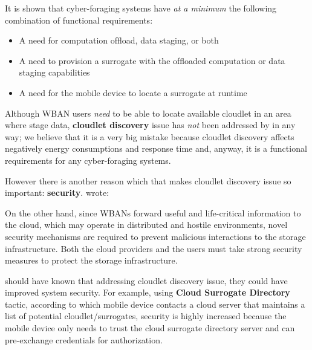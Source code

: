 \documentclass[sigchi]{acmart}
\begin{document}
It is shown \cite{DecisionModel} that cyber-foraging systems have \textit{at a minimum} the following combination of functional requirements:

\begin{itemize}

\item  A need for computation ofﬂoad, data staging, or both
\item  A need to provision a surrogate with the ofﬂoaded computation or data staging capabilities
\item  A need for the mobile device to locate a surrogate at runtime

\end{itemize}

Although WBAN users \textit{need} to be able to locate available cloudlet in an area where stage data, \textbf{cloudlet discovery} issue has \textit{not} been addressed by \citet{MSAReport} in any way; we believe that it is a very big mistake because cloudlet discovery affects negatively energy consumptions and response time and, anyway, it is a functional requirements for any cyber-foraging systems. 

However there is another reason which that makes cloudlet discovery issue so important: \textbf{security}. \citep{MSAReport} wrote:

\vspace{0.3cm}

\begin{quoting}[font=itshape, begintext={``}, endtext={''\cite[par.~3.3]{MSAReport}}]
On the other hand, since WBANs forward useful and life-critical information to the cloud, which may operate in distributed and hostile environments, novel security mechanisms are required to prevent malicious interactions to the storage infrastructure. Both the cloud providers and the users must take strong security measures to protect the storage infrastructure.
\end{quoting}

\vspace{0.3cm}

\citet{MSAReport} should have known that addressing cloudlet discovery issue, they could have improved system security. For example, using \textbf{Cloud Surrogate Directory} tactic, according to which mobile device contacts a cloud server that maintains a list of potential cloudlet/surrogates, security is highly increased because the mobile device only needs to trust the cloud surrogate directory server and can pre-exchange credentials for authorization. 
\end{document}
